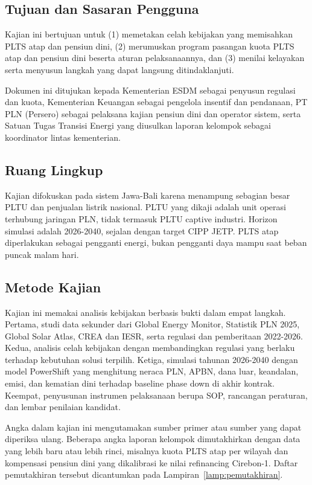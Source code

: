 \subsection{Tujuan dan Sasaran Pengguna}

Kajian ini bertujuan untuk (1) memetakan celah kebijakan yang memisahkan PLTS atap dan pensiun dini, (2) merumuskan program pasangan kuota PLTS atap dan pensiun dini beserta aturan pelaksanaannya, dan (3) menilai kelayakan serta menyusun langkah yang dapat langsung ditindaklanjuti.

Dokumen ini ditujukan kepada Kementerian ESDM sebagai penyusun regulasi dan kuota, Kementerian Keuangan sebagai pengelola insentif dan pendanaan, PT PLN (Persero) sebagai pelaksana kajian pensiun dini dan operator sistem, serta Satuan Tugas Transisi Energi yang diusulkan laporan kelompok sebagai koordinator lintas kementerian.

\subsection{Ruang Lingkup}

Kajian difokuskan pada sistem Jawa-Bali karena menampung sebagian besar PLTU dan penjualan listrik nasional. PLTU yang dikaji adalah unit operasi terhubung jaringan PLN, tidak termasuk PLTU captive industri. Horizon simulasi adalah 2026-2040, sejalan dengan target CIPP JETP. PLTS atap diperlakukan sebagai pengganti energi, bukan pengganti daya mampu saat beban puncak malam hari.

\subsection{Metode Kajian}

Kajian ini memakai analisis kebijakan berbasis bukti dalam empat langkah. Pertama, studi data sekunder dari Global Energy Monitor, Statistik PLN 2025, Global Solar Atlas, CREA dan IESR, serta regulasi dan pemberitaan 2022-2026. Kedua, analisis celah kebijakan dengan membandingkan regulasi yang berlaku terhadap kebutuhan solusi terpilih. Ketiga, simulasi tahunan 2026-2040 dengan model PowerShift yang menghitung neraca PLN, APBN, dana luar, keandalan, emisi, dan kematian dini terhadap baseline phase down di akhir kontrak. Keempat, penyusunan instrumen pelaksanaan berupa SOP, rancangan peraturan, dan lembar penilaian kandidat.

Angka dalam kajian ini mengutamakan sumber primer atau sumber yang dapat diperiksa ulang. Beberapa angka laporan kelompok dimutakhirkan dengan data yang lebih baru atau lebih rinci, misalnya kuota PLTS atap per wilayah dan kompensasi pensiun dini yang dikalibrasi ke nilai refinancing Cirebon-1. Daftar pemutakhiran tersebut dicantumkan pada Lampiran~\ref{lamp:pemutakhiran}.
